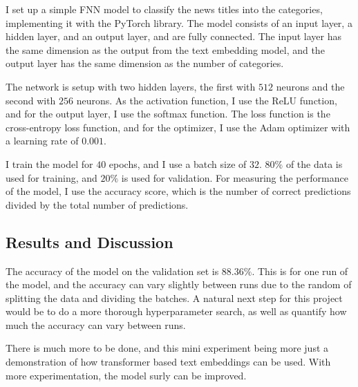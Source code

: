 I set up a simple FNN model to classify the news titles into the categories, implementing 
it with the PyTorch library. The model consists of an input layer, a hidden layer, and an output layer,
and are fully connected. The input layer has the same dimension as the output from the text embedding model,
and the output layer has the same dimension as the number of categories. 

The network is setup with two hidden layers, the first with
$512$ neurons and the second with $256$ neurons.
As the activation function, I use the ReLU function, and for the output layer, I use the softmax function.
The loss function is the cross-entropy loss function, and for the optimizer, I use the Adam optimizer
with a learning rate of $0.001$.

I train the model for $40$ epochs, and I use a batch size of $32$. 
$80\%$ of the data is used for training, and $20\%$ is used for validation.
For measuring the performance of the model, I use the accuracy score,
which is the number of correct predictions divided by the total number of predictions.

\subsection{Results and Discussion}

The accuracy of the model on the validation set is $88.36\%$. This is 
for one run of the model, and the accuracy can vary slightly between runs
due to the random of splitting the data and dividing the batches.
A natural next step for this project would be to do a more thorough hyperparameter search,
as well as quantify how much the accuracy can vary between runs.

There is much more to be done, and this mini experiment being more just 
a demonstration of how transformer based text embeddings can be used.
With more experimentation, the model surly can be improved. 

